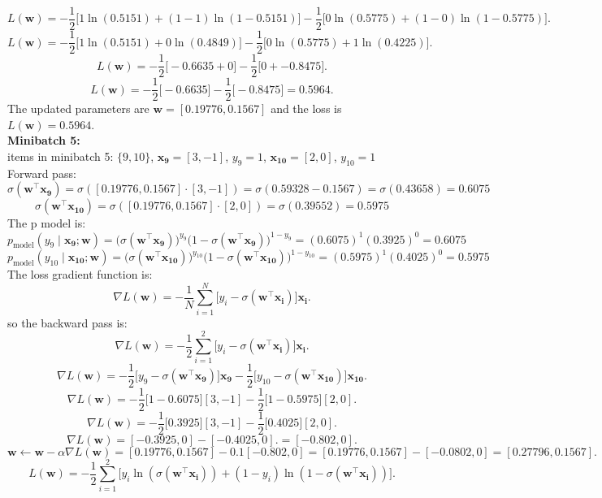 \documentclass[a3paper,12pt]{article} %
\begin{document}
\[
L(\mathbf{w}) = -\frac{1}{2} \big[1 \ln(0.5151) + (1-1) \ln(1-0.5151)\big] - \frac{1}{2} \big[0 \ln(0.5775) + (1-0) \ln(1-0.5775)\big].
\]
\[
L(\mathbf{w}) = -\frac{1}{2} \big[1 \ln(0.5151) + 0 \ln(0.4849)\big] - \frac{1}{2} \big[0 \ln(0.5775) + 1 \ln(0.4225)\big].
\]
\[
L(\mathbf{w}) = -\frac{1}{2} \big[-0.6635 + 0\big] - \frac{1}{2} \big[0 + -0.8475\big].
\]
\[
L(\mathbf{w}) = -\frac{1}{2} \big[-0.6635\big] - \frac{1}{2} \big[-0.8475\big] = 0.5964. 
\]
The updated parameters are \(\mathbf{w} = \mathbf{[0.19776, 0.1567]}\) and the loss is \(L(\mathbf{w}) = \mathbf{0.5964}\).
\\ \textbf{Minibatch 5:}
\\ items in minibatch 5: \(\{9, 10\}\), \(\mathbf{x_9} = [3, -1]\), \(y_9 = 1\), \(\mathbf{x_{10}} = [2, 0]\), \(y_{10} = 1\)
\\ Forward pass:
\[
\sigma(\mathbf{w}^\top \mathbf{x_9}) = \sigma([0.19776, 0.1567] \cdot [3, -1]) = \sigma(0.59328 - 0.1567) = \sigma(0.43658) = 0.6075
\]
\[
\sigma(\mathbf{w}^\top \mathbf{x_{10}}) = \sigma([0.19776, 0.1567] \cdot [2, 0]) = \sigma(0.39552) = 0.5975
\]
The p model is:
\[
p_{\text{model}}(y_9 \mid \mathbf{x_9}; \mathbf{w}) = \big(\sigma(\mathbf{w}^\top \mathbf{x_9})\big)^{y_9} \big(1 - \sigma(\mathbf{w}^\top \mathbf{x_9})\big)^{1-y_9} = (0.6075)^1 (0.3925)^0 = 0.6075
\]
\[
p_{\text{model}}(y_{10} \mid \mathbf{x_{10}}; \mathbf{w}) = \big(\sigma(\mathbf{w}^\top \mathbf{x_{10}})\big)^{y_{10}} \big(1 - \sigma(\mathbf{w}^\top \mathbf{x_{10}})\big)^{1-y_{10}} = (0.5975)^1 (0.4025)^0 = 0.5975
\]
The loss gradient function is:
\[
\nabla L(\mathbf{w}) = -\frac{1}{N} \sum^N_{i=1} \big[y_i - \sigma(\mathbf{w}^\top \mathbf{x_i})\big] \mathbf{x_i}.
\]
so the backward pass is:
\[
\nabla L(\mathbf{w}) = -\frac{1}{2} \sum^2_{i=1} \big[y_i - \sigma(\mathbf{w}^\top \mathbf{x_i})\big] \mathbf{x_i}.
\]
\[
\nabla L(\mathbf{w}) = -\frac{1}{2} \big[y_9 - \sigma(\mathbf{w}^\top \mathbf{x_9})\big] \mathbf{x_9} - \frac{1}{2} \big[y_{10} - \sigma(\mathbf{w}^\top \mathbf{x_{10}})\big] \mathbf{x_{10}}.
\]
\[
\nabla L(\mathbf{w}) = -\frac{1}{2} \big[1 - 0.6075\big] [3, -1] - \frac{1}{2} \big[1 - 0.5975\big] [2, 0].
\]
\[
\nabla L(\mathbf{w}) = -\frac{1}{2} \big[0.3925] [3, -1] - \frac{1}{2} \big[0.4025] [2, 0].
\]
\[
\nabla L(\mathbf{w}) = [-0.3925, 0] - [-0.4025, 0]. = [-0.802, 0].
\]
\[
\mathbf{w} \gets \mathbf{w} - \alpha \nabla L(\mathbf{w}) = [0.19776, 0.1567] - 0.1 [-0.802, 0] = [0.19776, 0.1567] - [-0.0802, 0] = [0.27796, 0.1567].
\]
\[
L(\mathbf{w}) = -\frac{1}{2} \sum^2_{i=1} \big[y_i \ln(\sigma(\mathbf{w}^\top \mathbf{x_i})) + (1-y_i) \ln(1-\sigma(\mathbf{w}^\top \mathbf{x_i}))\big].
\]
\end{document}
